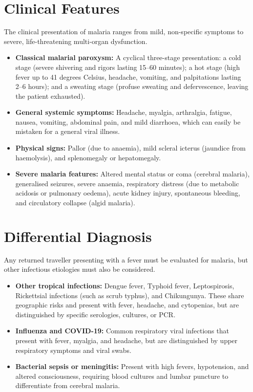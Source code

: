 \section*{Clinical Features}
The clinical presentation of malaria ranges from mild, non-specific symptoms to severe, life-threatening multi-organ dysfunction.
\begin{itemize}
    \item \textbf{Classical malarial paroxysm:} A cyclical three-stage presentation: a cold stage (severe shivering and rigors lasting 15--60 minutes); a hot stage (high fever up to 41 degrees Celsius, headache, vomiting, and palpitations lasting 2--6 hours); and a sweating stage (profuse sweating and defervescence, leaving the patient exhausted).
    \item \textbf{General systemic symptoms:} Headache, myalgia, arthralgia, fatigue, nausea, vomiting, abdominal pain, and mild diarrhoea, which can easily be mistaken for a general viral illness.
    \item \textbf{Physical signs:} Pallor (due to anaemia), mild scleral icterus (jaundice from haemolysis), and splenomegaly or hepatomegaly.
    \item \textbf{Severe malaria features:} Altered mental status or coma (cerebral malaria), generalised seizures, severe anaemia, respiratory distress (due to metabolic acidosis or pulmonary oedema), acute kidney injury, spontaneous bleeding, and circulatory collapse (algid malaria).
\end{itemize}

\section*{Differential Diagnosis}
Any returned traveller presenting with a fever must be evaluated for malaria, but other infectious etiologies must also be considered.
\begin{itemize}
    \item \textbf{Other tropical infections:} Dengue fever, Typhoid fever, Leptospirosis, Rickettsial infections (such as scrub typhus), and Chikungunya. These share geographic risks and present with fever, headache, and cytopenias, but are distinguished by specific serologies, cultures, or PCR.
    \item \textbf{Influenza and COVID-19:} Common respiratory viral infections that present with fever, myalgia, and headache, but are distinguished by upper respiratory symptoms and viral swabs.
    \item \textbf{Bacterial sepsis or meningitis:} Present with high fevers, hypotension, and altered consciousness, requiring blood cultures and lumbar puncture to differentiate from cerebral malaria.
\end{itemize}


